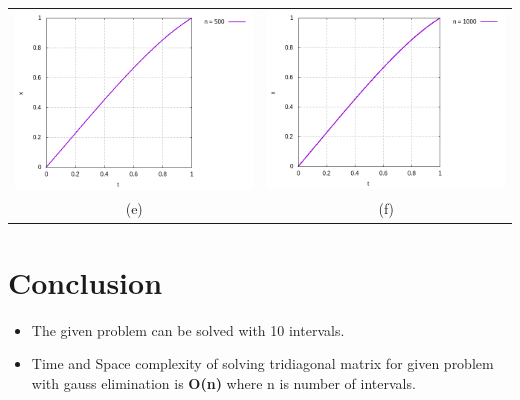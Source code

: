 \documentclass[12pt]{article}
\begin{document}
\begin{center}
\begin{tabular}{cc}
                \includegraphics[scale=0.5]{Plots/plot_n_500.png} & \includegraphics[scale=0.5]{Plots/plot_n_1000.png}\\
                (e) & (f)\\
            \end{tabular}
    	\end{center}
    \section{Conclusion}
    \begin{itemize}
        \item The given problem can be solved with 10 intervals.
        \item Time and Space complexity of solving tridiagonal matrix for given problem with gauss elimination is \textbf{O(n)} where n is number of intervals.
    \end{itemize}
\end{document}
